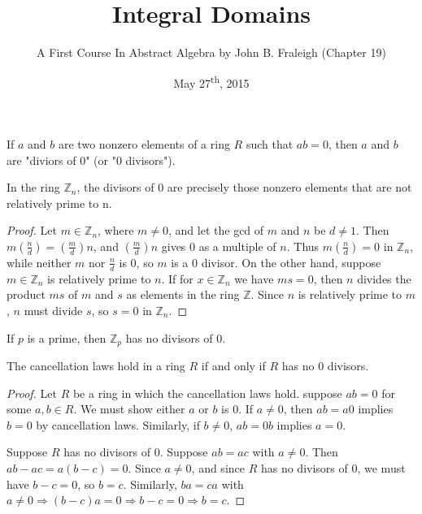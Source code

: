 \documentclass[a4paper,8pt]{article}
\title{Integral Domains}
\author{A First Course In Abstract Algebra by John B. Fraleigh (Chapter 19)}
\date{May 27\textsuperscript{th}, 2015}
\begin{document}
\maketitle
{}

\begin{outline}

    If \(a\) and \(b\) are two nonzero elements of a ring \(R\) such that \(ab = 0\), then \(a\) and
    \(b\) are "diviors of \(0\)" (or "\(0\) divisors").

    In the ring \(\mathbb{Z}_n\), the divisors of \(0\) are precisely those nonzero elements that are
    not relatively prime to n.

    \begin{proof}
      Let \(m \in \mathbb{Z}_n\), where \(m \neq 0\), and let the gcd of \(m\) and \(n\) be \(d \neq 1\). Then
      \(m(\frac{n}{d}) = (\frac{m}{d})n\), and \((\frac{m}{d})n\) gives \(0\) as a multiple of \(n\). Thus
      \(m(\frac{n}{d}) = 0\) in \(\mathbb{Z}_n\), while neither \(m\) nor \(\frac{n}{d}\) is \(0\), so \(m\)
      is a \(0\) divisor. On the other hand, suppose \(m \in \mathbb{Z}_n\) is relatively prime to \(n\). If
      for \(x \in \mathbb{Z}_n\) we have \(ms = 0\), then \(n\) divides the product \(ms\) of \(m\) and \(s\)
      as elements in the ring \(\mathbb{Z}\). Since \(n\) is relatively prime to \(m\), \(n\) must divide \(s\),
      so \(s = 0\) in \(\mathbb{Z}_n\).
    \end{proof}

    If \(p\) is a prime, then \(\mathbb{Z}_p\) has no divisors of \(0\).

    The cancellation laws hold in a ring \(R\) if and only if \(R\) has no \(0\) divisors.

    \begin{proof}
      \forward
        Let \(R\) be a ring in which the cancellation laws hold. suppose \(ab = 0\) for some \(a, b \in R\).
        We must show either \(a\) or \(b\) is \(0\). If \(a \neq 0\), then \(ab = a0\) implies \(b = 0\) by cancellation laws.
        Similarly, if \(b \neq 0\), \(ab = 0b\) implies \(a = 0\).

      \backward
        Suppose \(R\) has no divisors of \(0\). Suppose \(ab = ac\) with \(a \neq 0\). Then  \(ab - ac = a(b-c) = 0\).
        Since \(a \neq 0\), and since \(R\) has no divisors of \(0\), we must have \(b - c = 0\), so \(b = c\).
        Similarly, \(ba = ca\) with \(a \neq 0 \Rightarrow (b - c)a = 0 \Rightarrow b - c = 0 \Rightarrow b = c\).
    \end{proof}


\end{outline}
\end{document}
